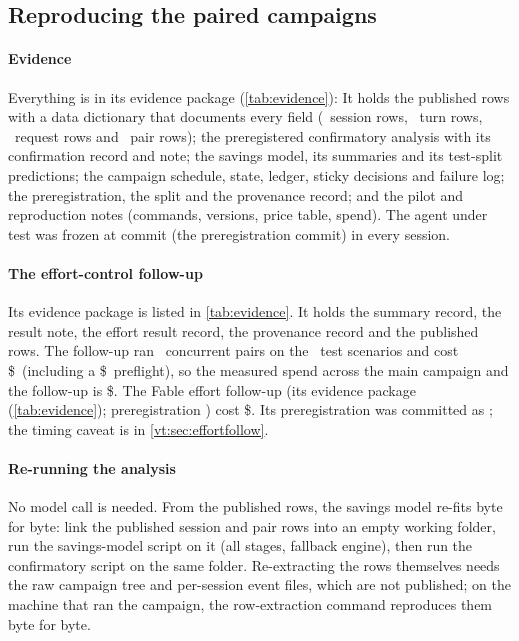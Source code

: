 \subsection{Reproducing the paired campaigns}\label{vt:sec:repro}

\paragraph{Evidence} Everything is in its evidence package (\cref{tab:evidence}):
It holds the published rows with a data dictionary that documents every field (\NSessions\ session rows, \NTurns\
turn rows, \NRequests\ request rows and \NPairs\ pair rows); the preregistered confirmatory analysis with its
confirmation record and note; the savings model, its summaries and its test-split predictions; the campaign schedule,
state, ledger, sticky decisions and failure log; the preregistration, the split and the provenance record; and the pilot
and reproduction notes (commands, versions, price table, spend).
The agent under test was frozen at commit \code{\BuildSha} (the preregistration commit) in every session.

\paragraph{The effort-control follow-up} Its evidence package is listed in \cref{tab:evidence}. It holds the summary record, the result note, the effort result record, the provenance record and the
published rows. The follow-up ran \EcPairs\ concurrent pairs on the \EcScen\ test scenarios and cost
\$\EcSpend\ (including a \$\EcPreflight\ preflight), so the measured spend across the main campaign and the
follow-up is \$\SpendWithFollowup. The Fable effort follow-up
(its evidence package (\cref{tab:evidence}); preregistration \code{\EfPreregSha}) cost \$\EfSpend. Its preregistration was committed as \code{\EcPreregSha}; the timing caveat is
in \cref{vt:sec:effortfollow}.

\paragraph{Re-running the analysis} No model call is needed. From the published rows, the savings model
re-fits byte for byte: link the published session and pair rows into an empty working folder, run the savings-model script on it (all stages, fallback engine), then run the confirmatory script on the same folder.
Re-extracting the rows themselves needs the raw campaign tree and per-session event files, which are not
published; on the machine that ran the campaign, the row-extraction command reproduces them byte for byte.

